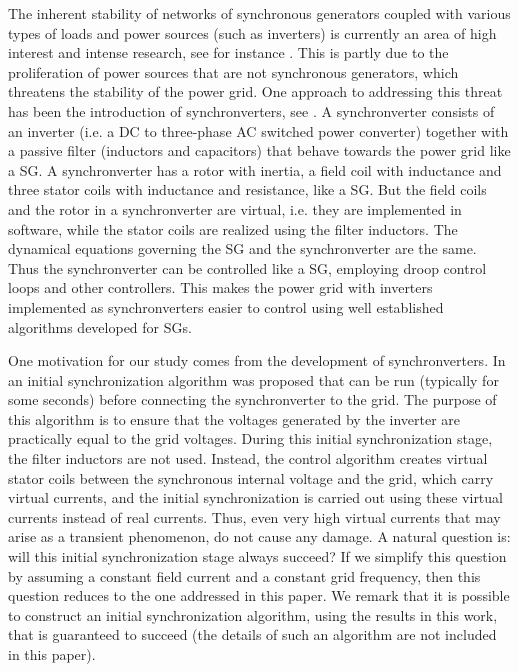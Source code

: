 \documentclass[12pt]{article}
\theoremstyle{definition}
\numberwithin{equation}{section}                        %
\begin{document}
The inherent stability of networks of synchronous generators coupled
with various types of loads and power sources (such as inverters) is
currently an area of high interest and intense research, see for
instance \cite{CaTa:14,DoBu:12,DoBu:14,FZOSS,SaPa:14}. This is partly
due to the proliferation of power sources that are not synchronous
generators, which threatens the stability of the power grid. One
approach to addressing this threat has been the introduction of
synchronverters, see \cite{BeHe:07,Bro:15,DoChLi:15,DrVi:08,
Zh_etal:14, ZhWe:09,ZhWe:11}. A synchronverter consists of an inverter
(i.e. a DC to three-phase AC switched power converter) together with a
passive filter (inductors and capacitors) that behave towards the
power grid like a SG. A synchronverter has a rotor with inertia, a
field coil with inductance and three stator coils with inductance and
resistance, like a SG. But the field coils and the rotor in a
synchronverter are virtual, i.e. they are implemented in software,
while the stator coils are realized using the filter inductors. The
dynamical equations governing the SG and the synchronverter are the
same. Thus the synchronverter can be controlled like a SG, employing
droop control loops and other controllers. This makes the power grid
with inverters implemented as synchronverters easier to control using
well established algorithms developed for SGs.

One motivation for our study comes from the development of
synchronverters. In \cite{Zh_etal:14} an initial synchronization
algorithm was proposed that can be run (typically for some seconds)
before connecting the synchronverter to the grid. The purpose of this
algorithm is to ensure that the voltages generated by the inverter are
practically equal to the grid voltages. During this initial
synchronization stage, the filter inductors are not used. Instead, the
control algorithm creates virtual stator coils between the synchronous
internal voltage and the grid, which carry virtual currents, and the
initial synchronization is carried out using these virtual currents
instead of real currents. Thus, even very high virtual currents that
may arise as a transient phenomenon, do not cause any damage. A
natural question is: will this initial synchronization stage always
succeed? If we simplify this question by assuming a constant field
current and a constant grid frequency, then this question reduces to
the one addressed in this paper. We remark that it is possible to
construct an initial synchronization algorithm, using the results in
this work, that is guaranteed to succeed (the details of such an
algorithm are not included in this paper).
\end{document}
